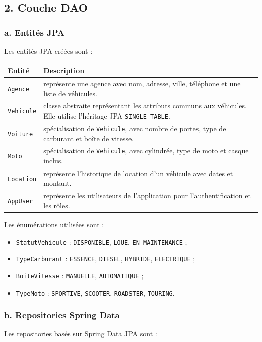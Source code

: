 \documentclass[12pt,a4paper]{article}
\newcommand{\code}[1]{\texttt{#1}}
\newcommand{\question}[1]{\subsection*{#1}}
\begin{document}
\question{2. Couche DAO}

\subsubsection*{a. Entités JPA}

Les entités JPA créées sont :

\begin{longtable}{|p{4cm}|p{10cm}|}
\hline
\textbf{Entité} & \textbf{Description} \\
\hline
\code{Agence} & représente une agence avec nom, adresse, ville, téléphone et une liste de véhicules. \\
\hline
\code{Vehicule} & classe abstraite représentant les attributs communs aux véhicules. Elle utilise l'héritage JPA \code{SINGLE\_TABLE}. \\
\hline
\code{Voiture} & spécialisation de \code{Vehicule}, avec nombre de portes, type de carburant et boîte de vitesse. \\
\hline
\code{Moto} & spécialisation de \code{Vehicule}, avec cylindrée, type de moto et casque inclus. \\
\hline
\code{Location} & représente l'historique de location d'un véhicule avec dates et montant. \\
\hline
\code{AppUser} & représente les utilisateurs de l'application pour l'authentification et les rôles. \\
\hline
\end{longtable}

Les énumérations utilisées sont :

\begin{itemize}
    \item \code{StatutVehicule} : \code{DISPONIBLE}, \code{LOUE}, \code{EN\_MAINTENANCE} ;
    \item \code{TypeCarburant} : \code{ESSENCE}, \code{DIESEL}, \code{HYBRIDE}, \code{ELECTRIQUE} ;
    \item \code{BoiteVitesse} : \code{MANUELLE}, \code{AUTOMATIQUE} ;
    \item \code{TypeMoto} : \code{SPORTIVE}, \code{SCOOTER}, \code{ROADSTER}, \code{TOURING}.
\end{itemize}

\subsubsection*{b. Repositories Spring Data}

Les repositories basés sur Spring Data JPA sont :
\end{document}
